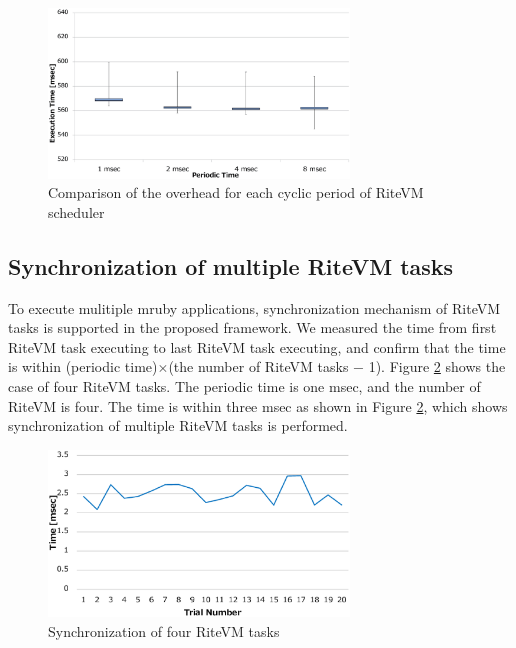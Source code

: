 \documentclass{sig-alternate-05-2015}
\begin{document}
\begin{figure}[t]
    \centering
    \includegraphics[width=8cm,clip]{figure/comparison_msec.eps}
    \vspace{1mm}
\caption{Comparison of the overhead for each cyclic period of RiteVM scheduler}
    \vspace{1mm}
\label{fig:comparison_msec}
\end{figure}

\subsection{Synchronization of multiple RiteVM tasks}
To execute mulitiple mruby applications, synchronization mechanism of RiteVM tasks is supported in the proposed framework.
We measured the time from first RiteVM task executing to last RiteVM task executing, and confirm that the time is within (periodic time)$\times$(the number of RiteVM tasks $-$ 1).
Figure \ref{fig:eval_synchronization} shows the case of four RiteVM tasks.
The periodic time is one msec, and the number of RiteVM is four.
The time is within three msec as shown in Figure \ref{fig:eval_synchronization}, which shows synchronization of multiple RiteVM tasks is performed.

\begin{figure}[t]
    \centering
    \includegraphics[width=8cm,clip]{figure/eval_synchronization.eps}
    \vspace{1mm}
\caption{Synchronization of four RiteVM tasks}
    \vspace{1mm}
\label{fig:eval_synchronization}
\end{figure}
\end{document}
